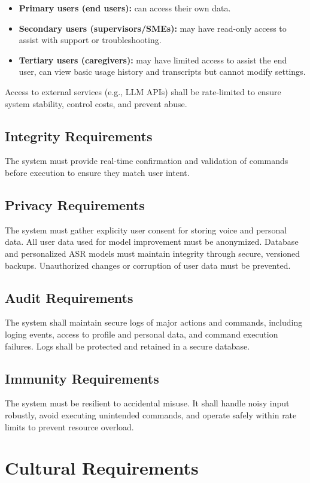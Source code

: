 \documentclass[11pt]{article}
\begin{document}
\begin{itemize}
    \item \textbf{Primary users (end users):} can access their own data.
    \item \textbf{Secondary users (supervisors/SMEs):} may have read-only access to assist with support or troubleshooting.
    \item \textbf{Tertiary users (caregivers):} may have limited access to assist the end user, can view basic usage history and transcripts but cannot modify settings.
\end{itemize}

Access to external services (e.g., LLM APIs) shall be rate-limited to ensure system stability, control costs, and prevent abuse.
\subsection{Integrity Requirements}
The system must provide real-time confirmation and validation of commands before execution to ensure they match user intent. 
\subsection{Privacy Requirements}
The system must gather explicity user consent for storing voice and personal data. All user data used for model improvement must be anonymized. Database and personalized ASR models must maintain integrity through secure, versioned backups. Unauthorized changes or corruption of user data must be prevented. 
\subsection{Audit Requirements}
The system shall maintain secure logs of major actions and commands, including loging events, access to profile and personal data, and command execution failures. Logs shall be protected and retained in a secure database. 
\subsection{Immunity Requirements}
The system must be resilient to accidental misuse. It shall handle noisy input robustly, avoid executing unintended commands, and operate safely within rate limits to prevent resource overload. 

\section{Cultural Requirements}
\end{document}
